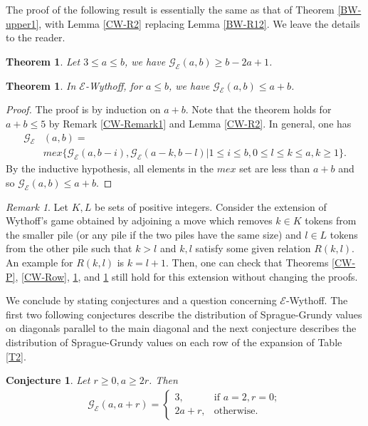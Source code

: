 \documentclass[12pt]{amsart}
\theoremstyle{plain}
\newtheorem{theorem}[proposition]{Theorem}
\newtheorem{conjecture}[proposition]{Conjecture}
\theoremstyle{definition}
\theoremstyle{remark}
\newtheorem{remark}{Remark}
\begin{document}
\smallskip
The proof of the following result is essentially the same as that of Theorem \ref{BW-upper1}, with Lemma \ref{CW-R2} replacing Lemma \ref{BW-R12}. We leave the details to the reader.

\begin{theorem} \label{CW-low}
Let $3 \leq a \leq b$, we have ${\mathcal{G}}_{\mathcal{E}}(a,b) \geq b - 2a + 1$.
\end{theorem}

\smallskip
\begin{theorem} \label{CW-high}
In ${\mathcal{E}}$-Wythoff, for $a \leq b$, we have ${\mathcal{G}}_{\mathcal{E}}(a,b) \leq a+b$.
\end{theorem}

\begin{proof}
The proof is by induction on $a+b$. Note that the theorem holds for $a + b \leq 5$ by Remark \ref{CW-Remark1} and Lemma \ref{CW-R2}. In general, one has
\begin{align*}
{\mathcal{G}}_{\mathcal{E}}&(a,b) = \\
       &mex\{ {\mathcal{G}}_{\mathcal{E}}(a,b-i), {\mathcal{G}}_{\mathcal{E}}(a-k,b-l) | 1\leq i \leq b, 0 \leq l \leq k \leq a, k \geq 1\}.
\end{align*}
By the inductive hypothesis, all elements in the $mex$ set are less than $a+b$ and so ${\mathcal{G}}_{\mathcal{E}}(a,b) \leq a+b$. \end{proof}

\smallskip
\begin{remark} \label{CW-Remark2}
Let $K, L$ be sets of positive integers. Consider the extension of Wythoff's game obtained by adjoining a move which removes $k \in K$ tokens from the smaller pile (or any pile if the two piles have the same size) and $l \in L$ tokens from the other pile such that $k > l$ and $k,l$ satisfy some given relation $R(k,l)$. An example for $R(k,l)$ is $k = l+1$. Then, one can check that Theorems \ref{CW-P}, \ref{CW-Row}, \ref{CW-low}, and \ref{CW-high} still hold for this extension without changing the proofs.
\end{remark}

We conclude by stating conjectures and a question concerning ${\mathcal{E}}$-Wythoff. The first two following conjectures describe the distribution of Sprague-Grundy values on diagonals parallel to the main diagonal and the next conjecture describes the distribution of Sprague-Grundy values on each row of the expansion of Table \ref{T2}.

\smallskip
\begin{conjecture} \label{EW-C1}
Let $r \geq 0, a \geq 2r$. Then
\begin{align*}
{\mathcal{G}}_{\mathcal{E}}(a,a+r) =
\begin{cases}
3,    &\text{if $a = 2, r = 0$}; \\
2a+r, &\text{otherwise}.
\end{cases}
\end{align*}
\end{conjecture}
\end{document}
